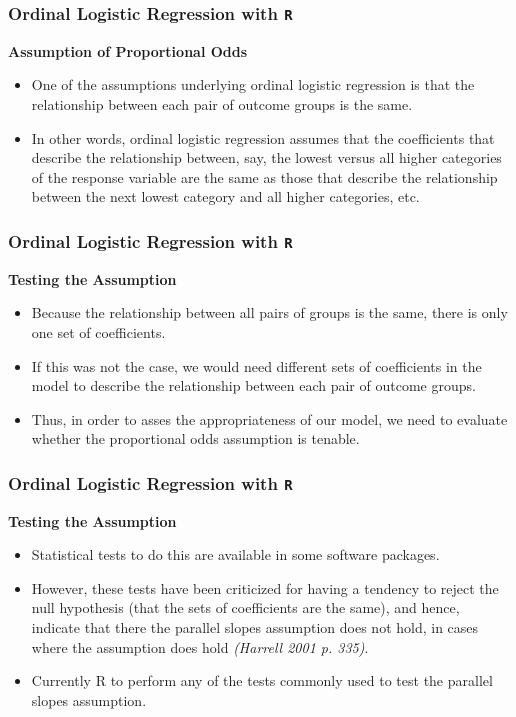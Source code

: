 \documentclass[00-GLMregslides.tex]{subfiles}
\begin{document}
\begin{frame}[fragile]
\frametitle{Ordinal Logistic Regression with \texttt{R}}
\large

\textbf{Assumption of Proportional Odds }

\begin{itemize}
\item One of the assumptions underlying ordinal logistic regression is that the relationship between each pair of outcome groups is the same. 
\item In other words, ordinal logistic regression assumes that the coefficients that describe the relationship between, say, the lowest versus all higher categories of the response variable are the same as those that describe the relationship between the next lowest category and all higher categories, etc. 
\end{itemize}		
\end{frame}
\begin{frame}[fragile]
\frametitle{Ordinal Logistic Regression with \texttt{R}}
\large
\textbf{Testing the Assumption}		
\begin{itemize} 
\item Because the relationship between all pairs of groups is the same, there is only one set of coefficients. 
\item If this was not the case, we would need different sets of coefficients in the model to describe the relationship between each pair of outcome groups. 
\item Thus, in order to asses the appropriateness of our model, we need to evaluate whether the proportional odds assumption is tenable.
\end{itemize}		
\end{frame}
\begin{frame}[fragile]
\frametitle{Ordinal Logistic Regression with \texttt{R}}
\Large
\textbf{Testing the Assumption}		
\begin{itemize}
\item Statistical tests to do this are available in some software packages. 
\item However, these tests have been criticized for having a tendency to reject the null hypothesis (that the sets of coefficients are the same), and hence, indicate that there the parallel slopes assumption does not hold, in cases where the assumption does hold \textit{ (Harrell 2001 p. 335)}. 
\item Currently R to perform any of the tests commonly used to test the parallel slopes assumption.
\end{itemize}
\end{frame}
\end{document}
